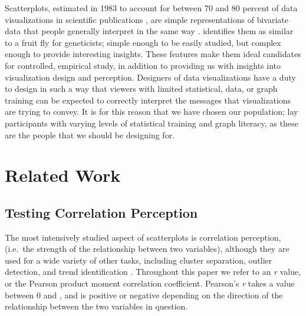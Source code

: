 \documentclass[preprint, 3p,
authoryear]{elsarticle} %
\begin{document}
Scatterplots, estimated in 1983 to account for between 70 and 80 percent
of data visualizations in scientific publications \citep{tufte_1983},
are simple representations of bivariate data that people generally
interpret in the same way \citep{kay_heer_2015}. \citet{rensink_2014}
identifies them as similar to a fruit fly for geneticists; simple enough
to be easily studied, but complex enough to provide interesting
insights. These features make them ideal candidates for controlled,
empirical study, in addition to providing us with insights into
visualization design and perception. Designers of data visualizations
have a duty to design in such a way that viewers with limited
statistical, data, or graph training can be expected to correctly
interpret the messages that visualizations are trying to convey. It is
for this reason that we have chosen our population; lay participants
with varying levels of statistical training and graph literacy, as these
are the people that we should be designing for.

\hypertarget{related-work}{%
\section{Related Work}\label{related-work}}

\hypertarget{testing}{%
\subsection{Testing Correlation Perception}\label{testing}}

The most intensively studied aspect of scatterplots is correlation
perception, (i.e.~the strength of the relationship between two
variables), although they are used for a wide variety of other tasks,
including cluster separation, outlier detection, and trend
identification \citep{behrisch_2021}. Throughout this paper we refer to
an \emph{r} value, or the Pearson product moment correlation
coefficient. Pearson's \emph{r} takes a value between 0 and
\textbar, and is positive or negative depending on the
direction of the relationship between the two variables in question.
\end{document}
